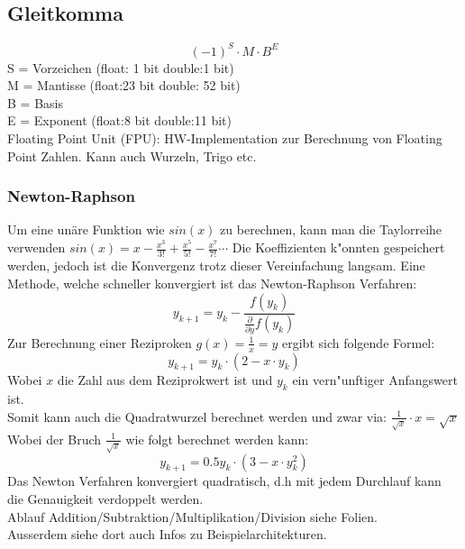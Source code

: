 \subsection{Gleitkomma}
\begin{equation}
(-1)^S\cdot M \cdot B^E
\end{equation}
S = Vorzeichen (float: 1 bit double:1 bit)\\
M = Mantisse (float:23 bit double: 52 bit)\\
B = Basis \\
E = Exponent (float:8 bit double:11 bit)\\

Floating Point Unit (FPU): HW-Implementation zur Berechnung von Floating Point Zahlen. Kann auch Wurzeln, Trigo etc.\\

\subsubsection{Newton-Raphson}
Um eine unäre Funktion wie $sin(x)$ zu berechnen, kann man die Taylorreihe verwenden $sin(x) = x - \frac{x^3}{3!} + \frac{x^5}{5!} - \frac{x^7}{7!}\cdots$ Die Koeffizienten k"onnten gespeichert werden, jedoch ist die Konvergenz trotz dieser Vereinfachung langsam. 
Eine Methode, welche schneller konvergiert ist das Newton-Raphson Verfahren: 
\begin{equation}
y_{k+1} = y_k - \frac{f(y_k)}{\frac{\partial}{\partial y}f(y_k)}
\end{equation}
Zur Berechnung einer Reziproken $g(x)=\frac{1}{x}=y$ ergibt sich folgende Formel: 
\begin{equation}
y_{k+1} = y_k\cdot (2-x\cdot y_k)
\end{equation}
Wobei $x$ die Zahl aus dem Reziprokwert ist und $y_k$ ein vern"unftiger Anfangswert ist. \\

Somit kann auch die Quadratwurzel berechnet werden und zwar via: $\frac{1}{\sqrt{x}} \cdot x = \sqrt{x}$\\
Wobei der Bruch $\frac{1}{\sqrt{x}}$ wie folgt berechnet werden kann:
\begin{equation}
y_{k+1} = 0.5y_k\cdot (3-x\cdot y_k^2)
\end{equation}
Das Newton Verfahren konvergiert quadratisch, d.h mit jedem Durchlauf kann die Genauigkeit verdoppelt werden.\\
Ablauf Addition/Subtraktion/Multiplikation/Division siehe Folien.\\
Ausserdem siehe dort auch Infos zu Beispielarchitekturen.
